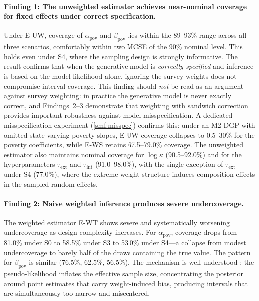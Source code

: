 \paragraph{Finding 1: The unweighted estimator achieves near-nominal
coverage for fixed effects under correct specification.}
Under E-UW, coverage of $\alpha_{\mathrm{pov}}$ and
$\beta_{\mathrm{pov}}$ lies within the 89--93\% range across all three
scenarios, comfortably within two MCSE of the 90\% nominal level. This
holds even under S4, where the sampling design is strongly informative.
The result confirms that when the generative model is \emph{correctly specified}
and inference is based on the model likelihood alone, ignoring the survey
weights does not compromise interval coverage.
This finding should \emph{not} be read as an argument against survey
weighting: in practice the generative model is never exactly correct,
and Findings~2--3 demonstrate that weighting with sandwich correction
provides important robustness against model misspecification.  A
dedicated misspecification experiment (\cref{smf:misspec}) confirms
this: under an M2 DGP with omitted state-varying poverty slopes,
E-UW coverage collapses to 0.5--30\% for the poverty coefficients,
while E-WS retains 67.5--79.0\% coverage.
The unweighted estimator
also maintains nominal coverage for $\log\kappa$ (90.5--92.0\%) and
for the hyperparameters $\tau_{\mathrm{ext}}$ and $\tau_{\mathrm{int}}$
(91.0--98.0\%), with the single exception of $\tau_{\mathrm{ext}}$ under
S4 (77.0\%), where the extreme weight structure induces composition
effects in the sampled random effects.

\paragraph{Finding 2: Naive weighted inference produces severe
undercoverage.}
The weighted estimator E-WT shows severe and systematically worsening
undercoverage as design complexity increases. For
$\alpha_{\mathrm{pov}}$, coverage drops from 81.0\% under S0 to 58.5\%
under S3 to 53.0\% under S4---a collapse from modest undercoverage to
barely half of the draws containing the true value. The pattern for
$\beta_{\mathrm{pov}}$ is similar (76.5\%, 62.5\%, 56.5\%). The
mechanism is well understood
\citep{SavitskyToth2016}: the pseudo-likelihood inflates the
effective sample size, concentrating the posterior around point
estimates that carry weight-induced bias, producing intervals that are
simultaneously too narrow and miscentered.

